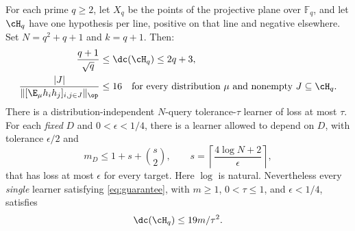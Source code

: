 \begin{theorem}\label{thm:plane}
For each prime $q\geq2$, let $X_q$ be the points of the projective plane over $\mathbb F_q$, and let $\cH_q$ have one hypothesis per line, positive on that line and negative elsewhere. Set $N=q^2+q+1$ and $k=q+1$. Then:
\begin{align}
 \frac{q+1}{\sqrt q}&\leq\dc(\cH_q)\leq2q+3,\label{eq:planedc}\\
 \frac{|J|}{\|[\E_\mu h_i h_j]_{i,j\in J}\|_\op}&\leq16
 \quad\text{for every distribution $\mu$ and nonempty $J\subseteq\cH_q$}.
 \label{eq:planeplain}
\end{align}
There is a distribution-independent $N$-query tolerance-$\tau$ learner of loss at most $\tau$. For each \emph{fixed} $D$ and $0<\epsilon<1/4$, there is a learner allowed to depend on $D$, with tolerance $\epsilon/2$ and
\[
 m_D\leq1+s+\binom{s}{2},\qquad
 s=\left\lceil\frac{4\log N+2}{\epsilon}\right\rceil,
\]
that has loss at most $\epsilon$ for every target. Here $\log$ is natural.
Nevertheless every \emph{single} learner satisfying \eqref{eq:guarantee}, with $m\geq1$, $0<\tau\leq1$, and $\epsilon<1/4$, satisfies
\begin{equation}\label{eq:plane19}
 \dc(\cH_q)\leq19m/\tau^2.
\end{equation}
\end{theorem}

